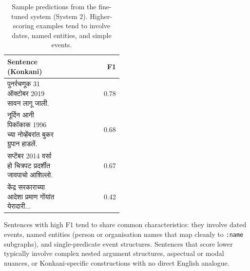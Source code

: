 \begin{table}[t]
\centering
\small
\begin{tabular}{p{0.47\linewidth}r}
\toprule
\textbf{Sentence (Konkani)} & \textbf{F1} \\
\midrule
पुनर्रचणूक 31 ऑक्टोबर 2019 सावन लागू जाली. & 0.78 \\
नूर्दिन आनी पिकॉकाक 1996 च्या नोव्हेंबरांत बुकर ग्रुपान हाडलें. & 0.68 \\
सप्टेंबर 2014 वर्सा हो चित्रपट प्रदर्शीत जावपाचो आशिल्लो. & 0.67 \\
\midrule
केंद्र सरकाराच्या आदेशा प्रमाण गोंयांत येरादारी... & 0.42 \\
\bottomrule
\end{tabular}
\caption{Sample predictions from the fine-tuned system (System 2). Higher-scoring examples tend to involve dates, named entities, and simple events.}
\label{tab:qualitative}
\end{table}

Sentences with high F1 tend to share common characteristics: they involve dated events, named entities (person or organisation names that map cleanly to \texttt{:name} subgraphs), and single-predicate event structures. Sentences that score lower typically involve complex nested argument structures, aspectual or modal nuances, or Konkani-specific constructions with no direct English analogue.

